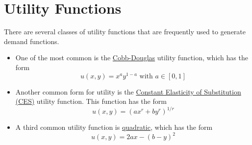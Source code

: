\documentclass[a4paper, 12pt, reqno]{article}
\begin{document}
\section{Utility Functions}
There are several classes of utility functions that are frequently used to generate demand functions. 
\begin{itemize}
    \item One of the most common is the \underline{Cobb-Douglas} utility function, which has the form $$u(x,y) = x^{a}y^{1-a}  \mbox{ with } a \in [0,1]$$
    \item Another common form for utility is the \underline{Constant Elasticity of Substitution (CES)} utility function. This function has the form $$u(x,y) = (ax^{r}+by^{r})^{1/r} $$
    \item A third common utility function is \underline{quadratic}, which has the form  $$u(x,y) = 2ax - (b-y)^{2}$$
\end{itemize}

\end{document}
